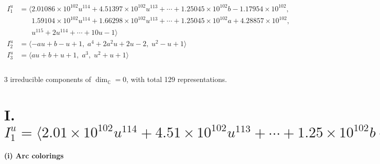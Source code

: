 \documentclass[1p]{elsarticle_modified}
\theoremstyle{definition}
\begin{document}
\begin{align*}
I^u_{1}&=\langle 
2.01086\times10^{102} u^{114}+4.51397\times10^{102} u^{113}+\cdots+1.25045\times10^{102} b-1.17954\times10^{102},\\
\phantom{I^u_{1}}&\phantom{= \langle  }1.59104\times10^{102} u^{114}+1.66298\times10^{102} u^{113}+\cdots+1.25045\times10^{102} a+4.28857\times10^{102},\\
\phantom{I^u_{1}}&\phantom{= \langle  }u^{115}+2 u^{114}+\cdots+10 u-1\rangle \\
I^u_{2}&=\langle 
- a u+b- u+1,\;a^4+2 a^2 u+2 u-2,\;u^2- u+1\rangle \\
I^u_{3}&=\langle 
a u+b+u+1,\;a^3,\;u^2+u+1\rangle \\
\\
\end{align*}
\raggedright * 3 irreducible components of $\dim_{\mathbb{C}}=0$, with total 129 representations.\\
\newpage
\renewcommand{\arraystretch}{1}
\centering \section*{I. $I^u_{1}= \langle 2.01\times10^{102} u^{114}+4.51\times10^{102} u^{113}+\cdots+1.25\times10^{102} b-1.18\times10^{102},\;1.59\times10^{102} u^{114}+1.66\times10^{102} u^{113}+\cdots+1.25\times10^{102} a+4.29\times10^{102},\;u^{115}+2 u^{114}+\cdots+10 u-1 \rangle$}
\flushleft \textbf{(i) Arc colorings}\\
\end{document}
